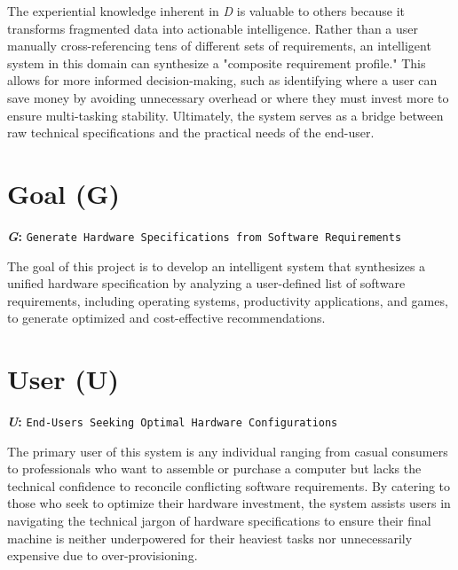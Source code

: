 \documentclass{article}
\begin{document}
The experiential knowledge inherent in \textit{D} is valuable to others because it transforms fragmented data into actionable intelligence. Rather than a user manually cross-referencing tens of different sets of requirements, an intelligent system in this domain can synthesize a "composite requirement profile." This allows for more informed decision-making, such as identifying where a user can save money by avoiding unnecessary overhead or where they must invest more to ensure multi-tasking stability. Ultimately, the system serves as a bridge between raw technical specifications and the practical needs of the end-user.


\section{Goal (G)}

\textbf{\textit{G}:} \texttt{Generate Hardware Specifications from Software Requirements}

The goal of this project is to develop an intelligent system that synthesizes a unified hardware specification by analyzing a user-defined list of software requirements, including operating systems, productivity applications, and games, to generate optimized and cost-effective recommendations.


\section{User (U)}

\textbf{\textit{U}:} \texttt{End-Users Seeking Optimal Hardware Configurations}

The primary user of this system is any individual ranging from casual consumers to professionals who want to assemble or purchase a computer but lacks the technical confidence to reconcile conflicting software requirements. By catering to those who seek to optimize their hardware investment, the system assists users in navigating the technical jargon of hardware specifications to ensure their final machine is neither underpowered for their heaviest tasks nor unnecessarily expensive due to over-provisioning.

\end{document}
